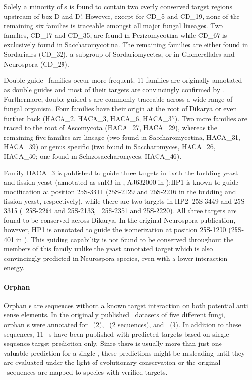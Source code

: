 Solely a minority of \cd s is found to contain two overly
conserved target regions upstream of box D and D'. However, except for
CD\_5 and CD\_19, none of
the remaining six families is traceable amongst all major fungal
lineages. Two families, CD\_17 and CD\_35, are found in Pezizomycotina
while CD\_67 is exclusively found in Saccharomycotina. The remaining
families are either found in Sordariales (CD\_32), a subgroup of
Sordariomycetes, or in Glomerellales and Neurospora (CD\_29). 

Double guide \haca\ families occur more frequent. 11 families are originally annotated as
double guides and most of their targets are convincingly confirmed
by \snostrip. Furthermore, double guided \haca s are commonly traceable across a wide
range of fungal organism. Four families have their origin at the root of Dikarya or
even further back (HACA\_2, HACA\_3, HACA\_6, HACA\_37). Two more families are traced to the root of
Ascomycota (HACA\_27, HACA\_29), whereas the remaining five families are lineage (two
found in Saccharomycotina, HACA\_31, HACA\_39) or genus specific (two found in
Saccharomyces, HACA\_26, HACA\_30; one found in Schizosaccharomyces, HACA\_46).

Family HACA\_3 is published to guide three targets in both the budding yeast
and fission yeast (annotated as snR3 in \sce, AJ632000 in \spo);HP1 is known to guide modification at position 25S-3311 (25S-2129 and
25S-2216 in the budding and fission yeast, respectively), while there
are two targets in HP2; 25S-3449 and 25S-3315 (\sce\ 25S-2264 and
25S-2133, \spo\ 25S-2351 and 25S-2220). All three targets are found to
be conserved across Dikarya. In the original Neurospora publication,
however, HP1 is annotated to guide the isomerization at position
25S-1200 (25S-401 in \Ncr). This guiding capability is not found to be
conserved throughout the members of this family unlike the yeast
annotated target which is also convincingly predicted in Neurospora
species, even with a lower interaction energy. 

\paragraph{\textbf{Orphan \sno}}
Orphan \sno s are sequences without a known target interaction on both
potential anti sense elements. In the originally published \sno\ datasets of five different fungi, orphan \cd s were annotated for \sce\
(2), \ncr\ (2 sequences), and \afu\ (9). In addition to these sequences,
11 \ncr\ \sno s have been published with predicted targets
based on single sequence target prediction only. Since there is
usually more than just one valuable prediction for a single \sno, these predictions might be
misleading until they are evaluated under the light of
evolutionary conservation or the original \sno\ sequences are mapped to species with verified
targets.

